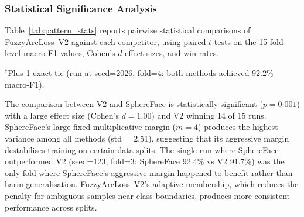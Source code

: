 \subsubsection{Statistical Significance Analysis}
\label{sec:eval:pattern:stats}

Table~\ref{tab:pattern_stats} reports pairwise statistical comparisons of
FuzzyArcLoss~V2 against each competitor, using paired $t$-tests on the 15
fold-level macro-F1 values, Cohen's $d$ effect sizes, and win rates.

\begin{table}[ht!]
\centering
\caption{Statistical comparison of FuzzyArcLoss~V2 against baseline loss
functions (15 paired runs).
Significant results ($p < 0.05$) are marked with~$^{*}$.
Win rate counts the number of runs (out of~15) where V2 achieved
strictly higher macro-F1.}
\label{tab:pattern_stats}
%
\begin{flushleft}
\footnotesize
$^{\dagger}$Plus 1 exact tie (run at seed=2026, fold=4:
both methods achieved 92.2\% macro-F1).
\end{flushleft}
\end{table}

The comparison between V2 and SphereFace is statistically significant
($p = 0.001$) with a large effect size (Cohen's $d = 1.00$) and V2
winning 14 of 15 runs.
SphereFace's large fixed multiplicative margin ($m = 4$) produces the
highest variance among all methods (std = 2.51), suggesting that its
aggressive margin destabilises training on certain data splits.
The single run where SphereFace outperformed V2 (seed=123, fold=3:
SphereFace 92.4\% vs V2 91.7\%) was the only fold where SphereFace's
aggressive margin happened to benefit rather than harm generalisation.
FuzzyArcLoss~V2's adaptive membership, which reduces the penalty for
ambiguous samples near class boundaries, produces more consistent
performance across splits.

